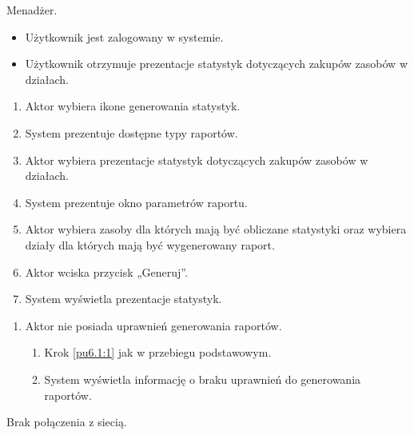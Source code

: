 Menadżer.

\begin{itemize}
\item Użytkownik jest zalogowany w systemie.
\end{itemize}

\begin{itemize}
\item Użytkownik otrzymuje prezentacje statystyk dotyczących zakupów zasobów w działach.
\end{itemize}

\begin{enumerate}
	\item \label{pu7.2.1:1} Aktor wybiera ikone generowania statystyk.
	\item System prezentuje dostępne typy raportów.
	\item \label{pu7.2.1:2} Aktor wybiera prezentacje statystyk dotyczących zakupów zasobów w działach.
	\item System prezentuje okno parametrów raportu.
	\item Aktor wybiera zasoby dla których mają być obliczane statystyki oraz wybiera działy dla których mają być wygenerowany raport.
	\item Aktor wciska przycisk „Generuj”.
	\item System wyświetla prezentacje statystyk.
\end{enumerate}

\begin{enumerate}
	\item Aktor nie posiada uprawnień generowania raportów.
	\begin{enumerate}[label*=\arabic*.]
		\item Krok \ref{pu6.1:1} jak w przebiegu podstawowym.
		\item System wyświetla informację o braku uprawnień do generowania raportów.
	\end{enumerate}
\end{enumerate}

Brak połączenia z siecią.

